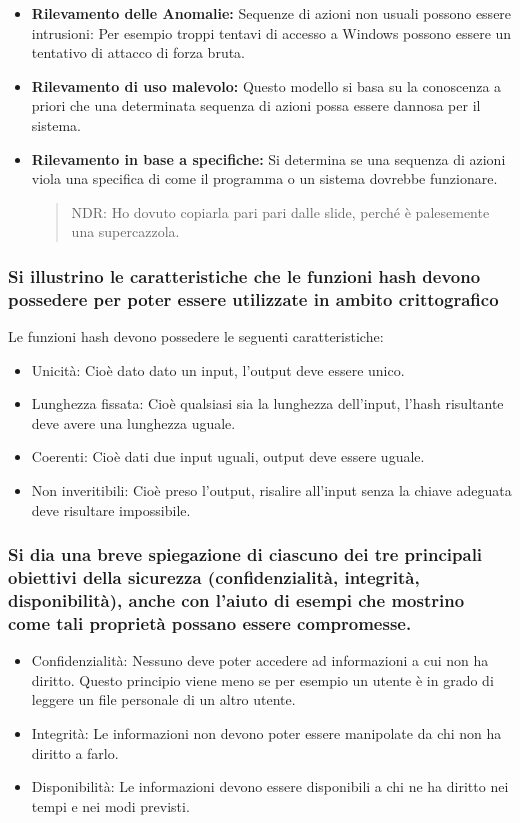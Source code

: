 \documentclass{article}
\begin{document}
\begin{itemize}
    \item \textbf{Rilevamento delle Anomalie:} Sequenze di azioni non usuali possono essere intrusioni:
    Per esempio troppi tentavi di accesso a Windows possono essere un tentativo di attacco di forza bruta.
    \item \textbf{Rilevamento di uso malevolo:} Questo modello si basa su la conoscenza a priori che una determinata sequenza di azioni possa essere dannosa per il sistema.
    \item \textbf{Rilevamento in base a specifiche:} Si determina se una sequenza di azioni viola una specifica di come il programma o un sistema dovrebbe funzionare. \begin{quote}
    NDR: Ho dovuto copiarla pari pari dalle slide, perché è palesemente una supercazzola.
    \end{quote}
\end{itemize}

\subsubsection*{Si illustrino le caratteristiche che le funzioni hash devono possedere per poter essere utilizzate in ambito crittografico}

Le funzioni hash devono possedere le seguenti caratteristiche:
\begin{itemize}
    \item Unicità: Cioè dato dato un input, l'output deve essere unico.
    \item Lunghezza fissata: Cioè qualsiasi sia la lunghezza dell'input, l'hash risultante deve avere una lunghezza uguale.
    \item Coerenti: Cioè dati due input uguali, output deve essere uguale.
    \item Non inveritibili: Cioè preso l'output, risalire all'input senza la chiave adeguata deve risultare impossibile.
\end{itemize}

\subsubsection*{Si dia una breve spiegazione di ciascuno dei tre principali obiettivi della sicurezza (confidenzialità, integrità, disponibilità), anche con l’aiuto di esempi che mostrino come tali proprietà possano essere compromesse. }

    \begin{itemize}
        \item Confidenzialità: Nessuno deve poter accedere ad informazioni a cui non ha diritto.
            Questo principio viene meno se per esempio un utente è in grado di leggere un file personale di un altro utente.
        \item Integrità: Le informazioni non devono poter essere manipolate da chi non ha diritto a farlo.
        \item Disponibilità: Le informazioni devono essere disponibili a chi ne ha diritto nei tempi e nei modi previsti.
    \end{itemize}
\end{document}

